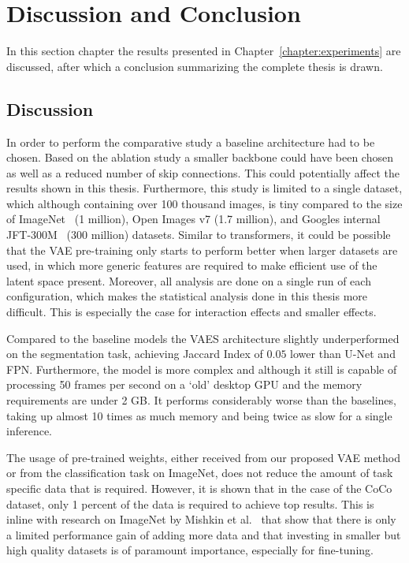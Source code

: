 \chapter{Discussion and Conclusion}\label{chapter:discussion}
In this section chapter the results presented in Chapter~\ref{chapter:experiments} are discussed, after which a conclusion summarizing the complete thesis is drawn. 

\section{Discussion}
In order to perform the comparative study a baseline architecture had to be chosen. Based on the ablation study a smaller backbone could have been chosen as well as a reduced number of skip connections. This could potentially affect the results shown in this thesis. Furthermore, this study is limited to a single dataset, which although containing over 100 thousand images, is tiny compared to the size of ImageNet~\cite{deng2009imagenet} (1 million), Open Images v7 \cite{OpenImages} (1.7 million), and Googles internal JFT-300M~\cite{DBLP:journals/corr/SunSSG17} (300 million) datasets. Similar to transformers, it could be possible that the VAE pre-training only starts to perform better when larger datasets are used, in which more generic features are required to make efficient use of the latent space present. Moreover, all analysis are done on a single run of each configuration, which makes the statistical analysis done in this thesis more difficult. This is especially the case for interaction effects and smaller effects.

Compared to the baseline models the VAES architecture slightly underperformed on the segmentation task, achieving Jaccard Index of $0.05$ lower than U-Net and FPN. Furthermore, the model is more complex and although it still is capable of processing 50 frames per second on a `old' desktop GPU and the memory requirements are under 2 GB. It performs considerably worse than the baselines, taking up almost 10 times as much memory and being twice as slow for a single inference.

The usage of pre-trained weights, either received from our proposed VAE method or from the classification task on ImageNet, does not reduce the amount of task specific data that is required. However, it is shown that in the case of the CoCo dataset, only 1 percent of the data is required to achieve top results. This is inline with research on ImageNet by Mishkin et al.~\cite{mishkin2017systematic} that show that there is only a limited performance gain of adding more data and that investing in smaller but high quality datasets is of paramount importance, especially for fine-tuning.

